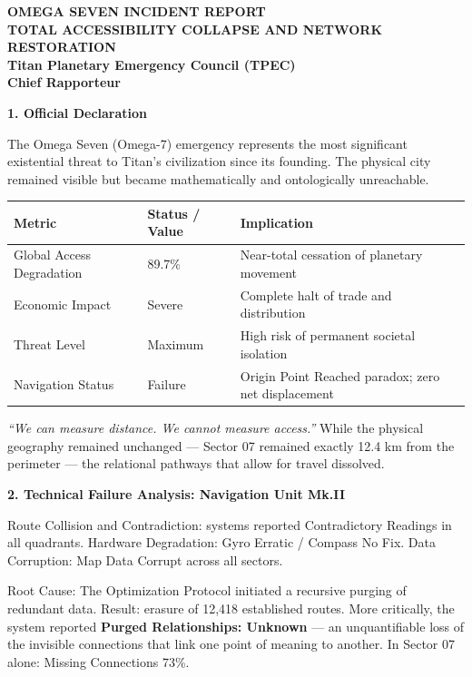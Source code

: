 \documentclass[11pt]{article}
\begin{document}
\begin{reportbox}
\textbf{OMEGA SEVEN INCIDENT REPORT\\
TOTAL ACCESSIBILITY COLLAPSE AND NETWORK RESTORATION\\
Titan Planetary Emergency Council (TPEC)\\
Chief Rapporteur}\\[6pt]
\small\color{archiveGold}

\textbf{1. Official Declaration}

The Omega Seven (Omega-7) emergency represents the most significant existential threat to Titan's civilization since its founding. The physical city remained visible but became mathematically and ontologically unreachable.

\begin{center}
\begin{tabular}{lll}
\toprule
\textbf{Metric} & \textbf{Status / Value} & \textbf{Implication} \\
\midrule
Global Access Degradation & 89.7\% & Near-total cessation of planetary movement \\
Economic Impact & Severe & Complete halt of trade and distribution \\
Threat Level & Maximum & High risk of permanent societal isolation \\
Navigation Status & Failure & Origin Point Reached paradox; zero net displacement \\
\bottomrule
\end{tabular}
\end{center}

\textit{``We can measure distance. We cannot measure access.''} While the physical geography remained unchanged --- Sector 07 remained exactly 12.4 km from the perimeter --- the relational pathways that allow for travel dissolved.

\textbf{2. Technical Failure Analysis: Navigation Unit Mk.II}

Route Collision and Contradiction: systems reported Contradictory Readings in all quadrants. Hardware Degradation: Gyro Erratic / Compass No Fix. Data Corruption: Map Data Corrupt across all sectors.

Root Cause: The Optimization Protocol initiated a recursive purging of redundant data. Result: erasure of 12,418 established routes. More critically, the system reported \textbf{Purged Relationships: Unknown} --- an unquantifiable loss of the invisible connections that link one point of meaning to another. In Sector 07 alone: Missing Connections 73\%.


\end{reportbox}
\end{document}
